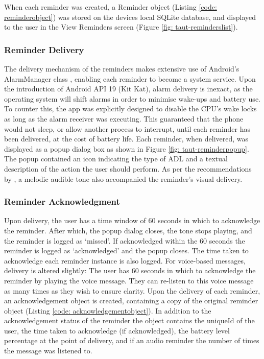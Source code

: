 When each reminder was created, a Reminder object (Listing \ref{code: reminderobject}) was stored on the devices local SQLite database, and displayed to the user in the View Reminders screen (Figure \ref{fig: taut-reminderslist}).

\subsubsection{Reminder Delivery} \label{subsubsection: android-alarmmanager}
The delivery mechanism of the reminders makes extensive use of Android's AlarmManager class \cite{GoogleAndroid2016}, enabling each reminder to become a system service. Upon the introduction of Android API 19 (Kit Kat), alarm delivery is inexact, as the operating system will shift alarms in order to minimise wake-ups and battery use. To counter this, the app was explicitly designed to disable the CPU's wake locks as long as the alarm receiver was executing. This guaranteed that the phone would not sleep, or allow another process to interrupt, until each reminder has been delivered, at the cost of battery life.
Each reminder, when delivered, was displayed as a popup dialog box as shown in Figure \ref{fig: taut-reminderpopup}. The popup contained an icon indicating the type of ADL and a textual description of the action the user should perform. As per the recommendations by \citeauthor{CenterforPersonswithDisabilities2015} \cite{CenterforPersonswithDisabilities2015}, a melodic audible tone also accompanied the reminder’s visual delivery.

\subsubsection{Reminder Acknowledgment}
Upon delivery, the user has a time window of 60 seconds in which to acknowledge the reminder. After which, the popup dialog closes, the tone stops playing, and the reminder is logged as ‘missed’. If acknowledged within the 60 seconds the reminder is logged as ‘acknowledged’ and the popup closes. The time taken to acknowledge each reminder instance is also logged.
For voice-based messages, delivery is altered slightly: The user has 60 seconds in which to acknowledge the reminder by playing the voice message. They can re-listen to this voice message as many times as they wish to ensure clarity.
Upon the delivery of each reminder, an acknowledgement object is created, containing a copy of the original reminder object (Listing \ref{code: acknowledgementobject}). In addition to the acknowledgement status of the reminder the object contains the uniqueId of the user, the time taken to acknowledge (if acknowledged), the battery level percentage at the point of delivery, and if an audio reminder the number of times the message was listened to.

